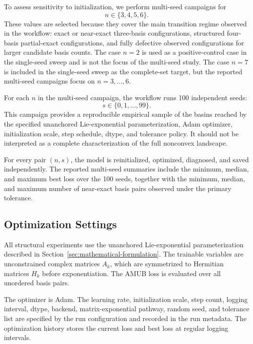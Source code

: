 \documentclass[a4paper,twocolumn,11pt,amsfonts,amssymb]{quantumarticle}
\begin{document}
To assess sensitivity to initialization, we perform multi-seed campaigns for
\[
n \in \{3,4,5,6\}.
\]
These values are selected because they cover the main transition regime observed in the workflow: exact or near-exact three-basis configurations, structured four-basis partial-exact configurations, and fully defective observed configurations for larger candidate basis counts. The case \(n=2\) is used as a positive-control case in the single-seed sweep and is not the focus of the multi-seed study. The case \(n=7\) is included in the single-seed sweep as the complete-set target, but the reported multi-seed campaigns focus on \(n=3,\ldots,6\).

For each \(n\) in the multi-seed campaign, the workflow runs 100 independent seeds:
\begin{equation*}
s \in \{0,1,\ldots,99\}.
\end{equation*}
This campaign provides a reproducible empirical sample of the basins reached by the specified unanchored Lie-exponential parameterization, Adam optimizer, initialization scale, step schedule, dtype, and tolerance policy. It should not be interpreted as a complete characterization of the full nonconvex landscape.

For every pair \((n,s)\), the model is reinitialized, optimized, diagnosed, and saved independently. The reported multi-seed summaries include the minimum, median, and maximum best loss over the 100 seeds, together with the minimum, median, and maximum number of near-exact basis pairs observed under the primary tolerance.

\subsection{Optimization Settings}

All structural experiments use the unanchored Lie-exponential parameterization described in Section~\ref{sec:mathematical-formulation}. The trainable variables are unconstrained complex matrices \(A_k\), which are symmetrized to Hermitian matrices \(H_k\) before exponentiation. The AMUB loss is evaluated over all unordered basis pairs.

The optimizer is Adam. The learning rate, initialization scale, step count, logging interval, dtype, backend, matrix-exponential pathway, random seed, and tolerance list are specified by the run configuration and recorded in the run metadata. The optimization history stores the current loss and best loss at regular logging intervals.
\end{document}
